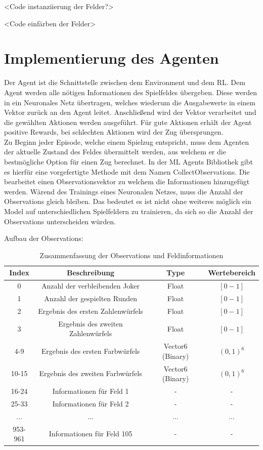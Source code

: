 <Code instanziierung der Felder?>

<Code einfärben der Felder>

\section{Implementierung des Agenten}
Der Agent ist die Schnittstelle zwischen dem Environment und dem RL.
Dem Agent werden alle nötigen Informationen des Spielfeldes übergeben. Diese werden in ein Neuronales Netz übertragen, welches wiederum die Ausgabewerte in einem Vektor zurück an den Agent leitet.
Anschließend wird der Vektor verarbeitet und die gewählten Aktionen werden ausgeführt.
Für gute Aktionen erhält der Agent positive Rewards, bei schlechten Aktionen wird der Zug übersprungen. \\
Zu Beginn jeder Episode, welche einem Spielzug entspricht, muss dem Agenten der aktuelle Zustand des Feldes übermittelt werden, aus welchem er die bestmögliche Option für einen Zug berechnet. In der ML Agents Bibliothek gibt es hierfür eine vorgefertigte Methode mit dem Namen CollectObservations. Die bearbeitet einen Observationsvektor zu welchem die Informationen hinzugefügt werden.
Wärend des Trainings eines Neuronalen Netzes, muss die Anzahl der Observations gleich bleiben. Das bedeutet es ist nicht ohne weiteres möglich ein Model auf unterschiedlichen Spielfeldern zu trainieren, da sich so die Anzahl der Observations unterscheiden würden.


Aufbau der Observations:
\begin{table}[htbp]
    \centering
    \begin{tabular}{|c|c|c|c|}
    \hline
    \textbf{Index} & \textbf{Beschreibung} & \textbf{Type} & \textbf{Wertebereich} \\
    \hline
    0 & Anzahl der verbleibenden Joker & Float & $[0 - 1]$ \\
    \hline
    1 & Anzahl der gespielten Runden & Float & $[0 - 1]$ \\
    \hline
    2 & Ergebnis des ersten Zahlenwürfels & Float & $[0 - 1]$ \\
    \hline
    3 & Ergebnis des zweiten Zahlenwürfels & Float & $[0 - 1]$ \\
    \hline
    4-9 & Ergebnis des ersten Farbwürfels & Vector6 (Binary) & $(0, 1)^6$ \\
    \hline
    10-15 & Ergebnis des zweiten Farbwürfels & Vector6 (Binary) & $(0, 1)^6$ \\
    \hline
    16-24 & Informationen für Feld 1 & - & - \\
    \hline
    25-33 & Informationen für Feld 2 & - & - \\
    \hline
    ... & ... & ... & ... \\
    \hline
    953-961 & Informationen für Feld 105 & - & - \\
    \hline
    \end{tabular}
    \caption{Zusammenfassung der Observations und Feldinformationen}
    \label{tab:combined_table}
\end{table}
    
